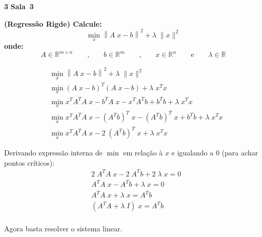 \documentclass{article}
\newcommand{\R}{\mathbb{R}}
\newenvironment{question}
    {\medskip\bfseries\large}
    {\medskip}
\newcounter{exe-list}
\newenvironment{exe}[2][Sala]
    {\bigskip\noindent\par\ifthenelse{\equal{#1}{}}%
        {\textbf{\LARGE #2}}%
        {\textbf{\LARGE #1~#2}}%
    \medskip\noindent\par}
    {\bigskip}
\begin{document}
\begin{exe}{3}
    \begin{question}
        (Regressão Rigde) Calcule:
        \[
            \min_x \left\|
                A \; x - b
            \right\|^2
            + \lambda \; \|x\|^2
        \]
        onde:
        \[
            A \in \R^{m \times n}
            \qquad\text{,}\qquad
            b \in \R^m
            \qquad\text{,}\qquad
            x \in \R^n
            \qquad\text{e}\qquad
            \lambda \in \R
        \]
    \end{question}

    \begin{align*}
        &\min_x \left\| A \; x - b \right\|^2 + \lambda \; \|x\|^2 \\
        &\min_x (A \; x - b)^T (A \; x - b) + \lambda \; x^T x \\
        &\min_x x^T A^T A \; x - b^T A \; x
            - x^T A^T b + b^T b + \lambda \; x^T x \\
        &\min_x x^T A^T A \; x - (A^T b)^T \; x
            - (A^T b)^T \; x + b^T b + \lambda \; x^T x \\
        &\min_x x^T A^T A \; x - 2 \; (A^T b)^T \; x
            + \lambda \; x^T x
    \end{align*}

    Derivando expressão interna de \(\min\) em relação à \(x\)
    e igualando a \(0\) (para achar pontos críticos):
    \begin{align*}
        &2 \; A^T A \; x - 2 \; A^T b + 2 \; \lambda \; x = 0 \\
        &A^T A \; x - A^T b + \lambda \; x = 0 \\
        &A^T A \; x + \lambda \; x = A^T b \\
        &(A^T A + \lambda \; I) \; x = A^T b \\
    \end{align*}

    Agora basta resolver o sistema linear.
\end{exe}
\end{document}

